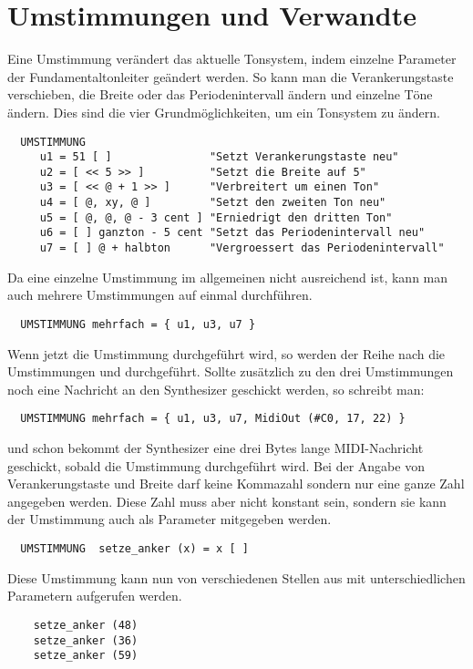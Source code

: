 \section{Umstimmungen und Verwandte}\label{sec:umst-und-verw}
Eine Umstimmung verändert das aktuelle Tonsystem, indem einzelne
Parameter der Fundamentaltonleiter geändert werden. So kann man die
Verankerungstaste verschieben, die Breite oder das
 Periodenintervall ändern und einzelne Töne ändern.
Dies sind die vier Grundmöglichkeiten, um ein Tonsystem zu ändern.
\begin{verbatim}
  UMSTIMMUNG  
     u1 = 51 [ ]               "Setzt Verankerungstaste neu"
     u2 = [ << 5 >> ]          "Setzt die Breite auf 5"
     u3 = [ << @ + 1 >> ]      "Verbreitert um einen Ton"
     u4 = [ @, xy, @ ]         "Setzt den zweiten Ton neu"
     u5 = [ @, @, @ - 3 cent ] "Erniedrigt den dritten Ton"
     u6 = [ ] ganzton - 5 cent "Setzt das Periodenintervall neu"
     u7 = [ ] @ + halbton      "Vergroessert das Periodenintervall"
\end{verbatim}
Da eine einzelne Umstimmung im allgemeinen nicht ausreichend ist, 
kann man auch mehrere Umstimmungen auf einmal durchführen.
\begin{verbatim}
  UMSTIMMUNG mehrfach = { u1, u3, u7 }
\end{verbatim}
Wenn jetzt die Umstimmung  durchgeführt wird,
so werden der Reihe nach die Umstimmungen  und
 durchgeführt. Sollte zusätzlich zu den drei Umstimmungen
noch eine Nachricht an den Synthesizer geschickt werden, so 
schreibt man:
\begin{verbatim}
  UMSTIMMUNG mehrfach = { u1, u3, u7, MidiOut (#C0, 17, 22) }
\end{verbatim}
und schon bekommt der Synthesizer eine drei Bytes lange
MIDI-Nachricht geschickt, sobald die Umstimmung
 durchgeführt wird.
Bei der Angabe von Verankerungstaste und Breite darf keine
Kommazahl sondern nur eine ganze Zahl angegeben werden.
Diese Zahl muss aber nicht konstant sein, sondern sie kann
der Umstimmung auch als Parameter mitgegeben werden.
\begin{verbatim}
  UMSTIMMUNG  setze_anker (x) = x [ ] 
\end{verbatim}
Diese Umstimmung kann nun von verschiedenen Stellen aus mit
unterschiedlichen Parametern aufgerufen werden.
\begin{verbatim}
    setze_anker (48)
    setze_anker (36)
    setze_anker (59)
\end{verbatim}
